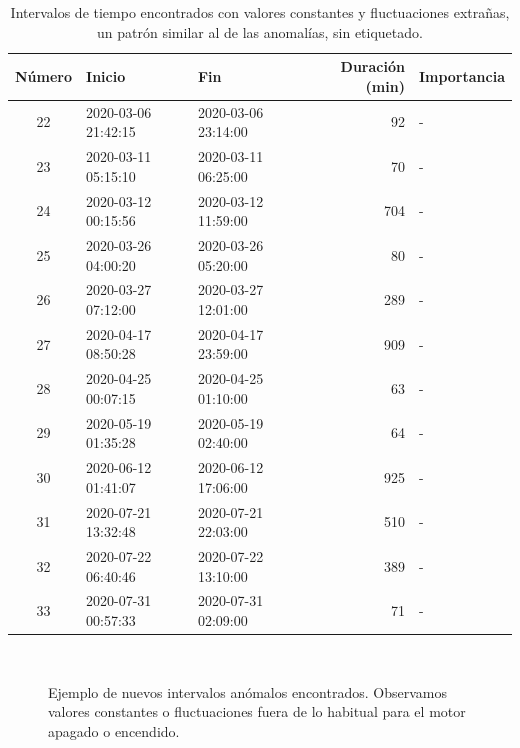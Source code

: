 \documentclass[12pt,letterpaper]{article}
\begin{document}
\begin{table}[htp]
    \centering
    \begin{tabular}{|c|l|l|r|l|}
    \hline
    \textbf{Número} & \textbf{Inicio}       & \textbf{Fin}         & \textbf{Duración (min)} & \textbf{Importancia} \\ \hline
    22 & 2020-03-06 21:42:15 & 2020-03-06 23:14:00 & 92 & - \\ \hline
    23 & 2020-03-11 05:15:10 & 2020-03-11 06:25:00 & 70 & - \\ \hline
    24 & 2020-03-12 00:15:56 & 2020-03-12 11:59:00 & 704 & - \\ \hline
    25 & 2020-03-26 04:00:20 & 2020-03-26 05:20:00 & 80 & - \\ \hline
    26 & 2020-03-27 07:12:00 & 2020-03-27 12:01:00 & 289 & - \\ \hline
    27 & 2020-04-17 08:50:28 & 2020-04-17 23:59:00 & 909 & - \\ \hline
    28 & 2020-04-25 00:07:15 & 2020-04-25 01:10:00 & 63 & - \\ \hline
    29 & 2020-05-19 01:35:28 & 2020-05-19 02:40:00 & 64 & - \\ \hline
    30 & 2020-06-12 01:41:07 & 2020-06-12 17:06:00 & 925 & - \\ \hline
    31 & 2020-07-21 13:32:48 & 2020-07-21 22:03:00 & 510 & - \\ \hline
    32 & 2020-07-22 06:40:46 & 2020-07-22 13:10:00 & 389 & - \\ \hline
    33 & 2020-07-31 00:57:33 & 2020-07-31 02:09:00 & 71 & - \\ \hline
    \end{tabular}
    \caption{Intervalos de tiempo encontrados con valores constantes y fluctuaciones extrañas, un patrón similar al de las anomalías, sin etiquetado.}
    \label{tab:EventosRaros}
\end{table}

\begin{figure}[htp]
        \centering
        \\
        \caption{Ejemplo de nuevos intervalos anómalos encontrados. Observamos valores constantes o fluctuaciones fuera de lo habitual para el motor apagado o encendido.}
        \label{fig:EventosRaros}
\end{figure}
\end{document}
